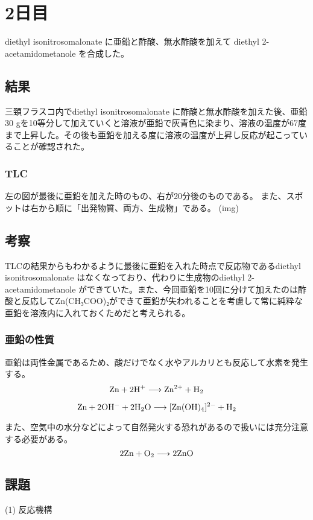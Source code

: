 

\section*{2日目}
diethyl isonitrosomalonate に亜鉛と酢酸、無水酢酸を加えて diethyl 2-acetamidometanole を合成した。

\subsection*{結果}
三頚フラスコ内でdiethyl isonitrosomalonate に酢酸と無水酢酸を加えた後、亜鉛30 gを10等分して加えていくと溶液が亜鉛で灰青色に染まり、溶液の温度が67度まで上昇した。その後も亜鉛を加える度に溶液の温度が上昇し反応が起こっていることが確認された。

\subsubsection*{TLC}
左の図が最後に亜鉛を加えた時のもの、右が20分後のものである。
また、スポットは右から順に「出発物質、両方、生成物」である。
(img)

\subsection*{考察}
TLCの結果からもわかるように最後に亜鉛を入れた時点で反応物であるdiethyl isonitrosomalonate はなくなっており、代わりに生成物のdiethyl 2-acetamidometanole ができていた。また、今回亜鉛を10回に分けて加えたのは酢酸と反応してZn(CH₃COO)₂ができて亜鉛が失われることを考慮して常に純粋な亜鉛を溶液内に入れておくためだと考えられる。

\subsubsection*{亜鉛の性質}
亜鉛は両性金属であるため、酸だけでなく水やアルカリとも反応して水素を発生する。
\[\rm Zn + 2 H^+ \longrightarrow Zn^{2+} + H_2\]

\[\rm Zn + 2OH^-+ 2H_2O \longrightarrow [Zn(OH)_4]^{2-} + H_2\]

また、空気中の水分などによって自然発火する恐れがあるので扱いには充分注意する必要がある。
\[ \rm 2 Zn + O_2 \longrightarrow 2ZnO\]

\subsection*{課題}

(1) 反応機構

